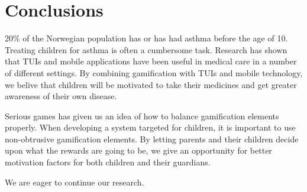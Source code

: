 \chapter{Conclusions}
\label{conclusions}

20\% of the Norwegian population has or has had asthma before the age of 10. Treating children for asthma is often a cumbersome task. Research has shown that TUIs and mobile applications have been useful in medical care in a number of different settings. By combining gamification with TUIs and mobile technology, we belive that children will be motivated to take their medicines and get greater awareness of their own disease.    


Serious games has given us an idea of how to balance gamification elements properly. When developing a system targeted for children, it is important to use non-obtrusive gamification elements. By letting parents and their children decide upon what the rewards are going to be, we give an opportunity for better motivation factors for both children and their guardians.   



We are eager to continue our research.


